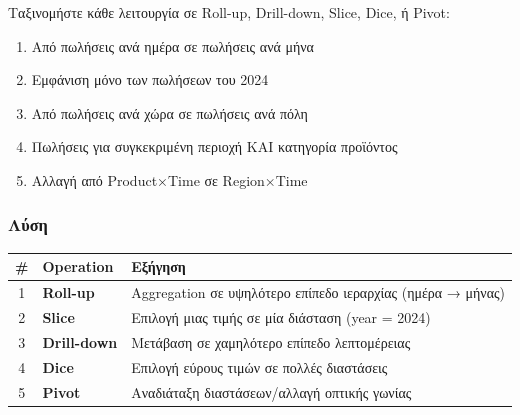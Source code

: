 \begin{formulabox}[Εκφώνηση]
Ταξινομήστε κάθε λειτουργία σε Roll-up, Drill-down, Slice, Dice, ή Pivot:

\begin{enumerate}
    \item Από πωλήσεις ανά ημέρα σε πωλήσεις ανά μήνα
    \item Εμφάνιση μόνο των πωλήσεων του 2024
    \item Από πωλήσεις ανά χώρα σε πωλήσεις ανά πόλη
    \item Πωλήσεις για συγκεκριμένη περιοχή ΚΑΙ κατηγορία προϊόντος
    \item Αλλαγή από Product×Time σε Region×Time
\end{enumerate}
\end{formulabox}

\subsubsection*{Λύση}

\begin{center}
\begin{tabular}{clp{6cm}}
\toprule
\textbf{\#} & \textbf{Operation} & \textbf{Εξήγηση} \\
\midrule
1 & \textbf{Roll-up} & Aggregation σε υψηλότερο επίπεδο ιεραρχίας (ημέρα → μήνας) \\
2 & \textbf{Slice} & Επιλογή μιας τιμής σε μία διάσταση (year = 2024) \\
3 & \textbf{Drill-down} & Μετάβαση σε χαμηλότερο επίπεδο λεπτομέρειας \\
4 & \textbf{Dice} & Επιλογή εύρους τιμών σε πολλές διαστάσεις \\
5 & \textbf{Pivot} & Αναδιάταξη διαστάσεων/αλλαγή οπτικής γωνίας \\
\bottomrule
\end{tabular}
\end{center}

\begin{center}
\end{center}

